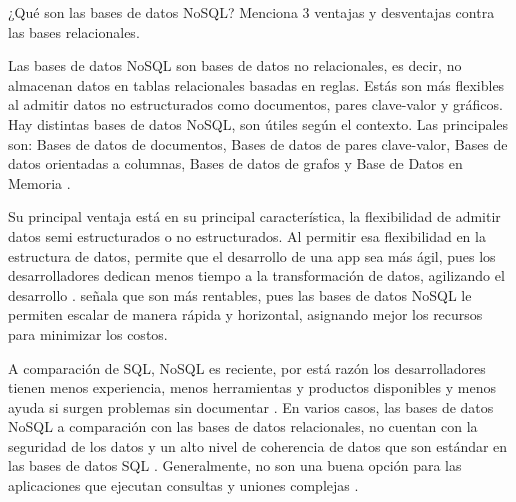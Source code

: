 \item ¿Qué son las bases de datos NoSQL? Menciona 3 ventajas y desventajas contra las bases relacionales.

Las bases de datos NoSQL son bases de datos no relacionales, es decir, no almacenan datos en tablas relacionales basadas en reglas. Estás son más flexibles al admitir datos no estructurados como documentos, pares clave-valor y gráficos. Hay distintas bases de datos NoSQL, son útiles según el contexto. Las principales son: Bases de datos de documentos, Bases de datos de pares clave-valor, Bases de datos orientadas a columnas, Bases de datos de grafos y Base de Datos en Memoria \parencite{google_sf}.

Su principal ventaja está en su principal característica, la flexibilidad de admitir datos semi estructurados o no estructurados. Al permitir esa flexibilidad en la estructura de datos, permite que el desarrollo de una app sea más ágil, pues los desarrolladores dedican menos tiempo a la transformación de datos, agilizando el desarrollo \parencite{google_sf}.
\textcite{ibm_sf} señala que son más rentables, pues las bases de datos NoSQL le permiten escalar de manera rápida y horizontal, asignando mejor los recursos para minimizar los costos.

A comparación de SQL, NoSQL es reciente, por está razón los desarrolladores tienen menos experiencia, menos herramientas y productos disponibles y menos ayuda si surgen problemas sin documentar \parencite{google_sf}.
En varios casos, las bases de datos NoSQL a comparación con las bases de datos relacionales, no cuentan con la seguridad de los datos y un alto nivel de coherencia de datos que son estándar en las bases de datos SQL \parencite{google_sf}.
Generalmente, no son una buena opción para las aplicaciones que ejecutan consultas y uniones complejas \parencite{google_sf}.
